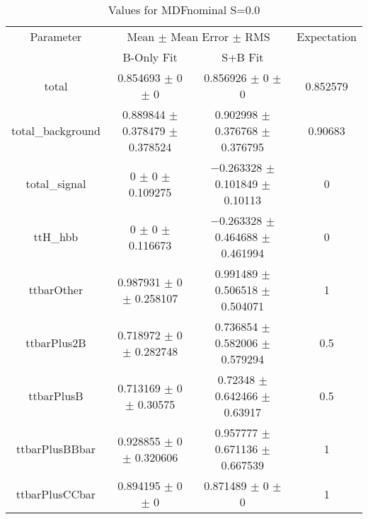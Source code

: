 \begin{table}
\centering
\caption{Values for MDFnominal S=0.0}
\begin{tabular}{cccc}
\toprule
Parameter & \multicolumn{2}{c}{Mean $\pm$ Mean Error $\pm$ RMS} & Expectation\\
 & B-Only Fit & S+B Fit & \\
\midrule
total & \num{0.854693} $\pm$ \num{0} $\pm$ \num{0} & \num{0.856926} $\pm$ \num{0} $\pm$ \num{0} & \num{0.852579}\\
total\_background & \num{0.889844} $\pm$ \num{0.378479} $\pm$ \num{0.378524} & \num{0.902998} $\pm$ \num{0.376768} $\pm$ \num{0.376795} & \num{0.90683}\\
total\_signal & \num{0} $\pm$ \num{0} $\pm$ \num{0.109275} & \num{-0.263328} $\pm$ \num{0.101849} $\pm$ \num{0.10113} & \num{0}\\
ttH\_hbb & \num{0} $\pm$ \num{0} $\pm$ \num{0.116673} & \num{-0.263328} $\pm$ \num{0.464688} $\pm$ \num{0.461994} & \num{0}\\
ttbarOther & \num{0.987931} $\pm$ \num{0} $\pm$ \num{0.258107} & \num{0.991489} $\pm$ \num{0.506518} $\pm$ \num{0.504071} & \num{1}\\
ttbarPlus2B & \num{0.718972} $\pm$ \num{0} $\pm$ \num{0.282748} & \num{0.736854} $\pm$ \num{0.582006} $\pm$ \num{0.579294} & \num{0.5}\\
ttbarPlusB & \num{0.713169} $\pm$ \num{0} $\pm$ \num{0.30575} & \num{0.72348} $\pm$ \num{0.642466} $\pm$ \num{0.63917} & \num{0.5}\\
ttbarPlusBBbar & \num{0.928855} $\pm$ \num{0} $\pm$ \num{0.320606} & \num{0.957777} $\pm$ \num{0.671136} $\pm$ \num{0.667539} & \num{1}\\
ttbarPlusCCbar & \num{0.894195} $\pm$ \num{0} $\pm$ \num{0} & \num{0.871489} $\pm$ \num{0} $\pm$ \num{0} & \num{1}\\
\bottomrule
\end{tabular}
\end{table}